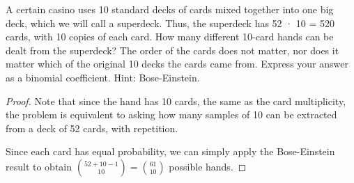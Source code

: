 \begin{exercise}{13}
    A certain casino uses 10 standard decks of cards mixed together into one big deck, which
we will call a superdeck. Thus, the superdeck has 52 · 10 = 520 cards, with 10 copies
of each card. How many different 10-card hands can be dealt from the superdeck? The
order of the cards does not matter, nor does it matter which of the original 10 decks
the cards came from. Express your answer as a binomial coefficient.
Hint: Bose-Einstein.
\end{exercise}

\begin{proof}
    Note that since the hand has 10 cards, the same as the card multiplicity, the problem is equivalent to asking
    how many samples of 10 can be extracted from a deck of 52 cards, with repetition.

    Since each card has equal probability, we can simply apply the Bose-Einstein result to obtain ${52+10-1 \choose 10} = {61 \choose 10}$ possible hands.
\end{proof}


